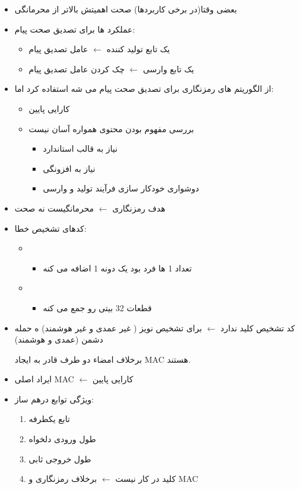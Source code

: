 \documentclass{report}
\begin{document}
	\begin{itemize}
		\item 
		بعضی وقتا(در برخی کاربردها) صحت اهمیتش بالاتر از محرمانگی
		\item 
عملکرد ها برای تصدیق صحت پیام:
			\begin{itemize}
				 \item 
				یک تابع تولید کننده 
				$\leftarrow$
				 عامل تصدیق پیام
				 \item
				 یک تابع وارسی
				 $\leftarrow$
				 چک کردن عامل تصدیق پیام
				
			\end{itemize}
		\item 
			از الگوریتم های رمزنگاری برای تصدیق صحت پیام می شه استفاده کرد اما:
				\begin{itemize}
					\item 
					کارایی پایین
					\item
					 بررسی مفهوم بودن محتوی همواره آسان نیست
					 	\begin{itemize}
					 		\item 
					 		نیاز به قالب استاندارد
					 		\item 
					 		نیاز به افزونگی
					 		\item 
					 		دوشواری خودکار سازی فرآیند تولید و وارسی
					 	\end{itemize}
				\end{itemize}
		\item 
			هدف رمزنگاری
			$\leftarrow$
			محرمانگیست نه صحت
		\item 
			کدهای تشخیص خطا:
			\begin{itemize}
				\item {}	
					\begin{itemize}
						\item 
						تعداد 1 ها فرد بود یک دونه 1 اضافه می کنه
					\end{itemize}
				\item {}
					\begin{itemize}
						\item 
						قطعات 32 بیتی رو جمع می کنه
					\end{itemize}
			\end{itemize}
		\item 
		کد تشخیص کلید ندارد
		$\leftarrow$
		برای تشخیص نویز ( غیر عمدی و غیر هوشمند) ه حمله دشمن (عمدی و هوشمند)
		
		برخلاف امضاء دو طرف قادر به ایجاد MAC هستند.
		\item 
ایراد اصلی MAC 
$\leftarrow$
 کارایی پایین
		\item 
ویژگی توابع درهم ساز:
			\begin{enumerate}
				\item 
				تابع یکطرفه
				\item 
				طول ورودی دلخواه
				\item 
				طول خروجی ثابی
				\item 
				کلید در کار نیست 
				$\leftarrow$
				برخلاف رمزنگاری و MAC
			\end{enumerate}
	

\end{itemize}
\end{document}
